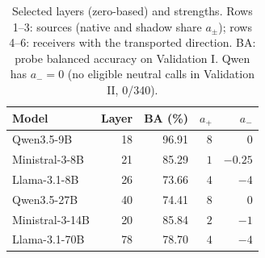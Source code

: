 \begin{table}[t]
\centering\scriptsize\setlength{\tabcolsep}{3pt}
\begin{tabular}{lrrrr}
\toprule
Model & Layer & BA (\%) & $a_+$ & $a_-$ \\
\midrule
Qwen3.5-9B & 18 & 96.91 & $8$ & $0$ \\
Ministral-3-8B & 21 & 85.29 & $1$ & $-0.25$ \\
Llama-3.1-8B & 26 & 73.66 & $4$ & $-4$ \\
Qwen3.5-27B & 40 & 74.41 & $8$ & $0$ \\
Ministral-3-14B & 20 & 85.84 & $2$ & $-1$ \\
Llama-3.1-70B & 78 & 78.70 & $4$ & $-4$ \\
\bottomrule
\end{tabular}
\caption{Selected layers (zero-based) and strengths. Rows 1--3: sources
(native and shadow share $a_\pm$); rows 4--6: receivers with the
transported direction. BA: probe balanced accuracy on Validation I.
Qwen has $a_-=0$ (no eligible neutral calls in Validation II, 0/340).}
\label{tab:current-configuration}
\end{table}
